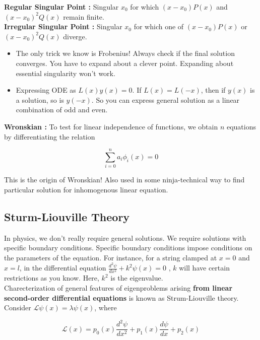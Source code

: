 \documentclass{report}
\begin{document}
\noindent \textbf{Regular Singular Point :} Singular $x_0$ for which $(x-x_0)P(x)$ and $(x-x_0)^2 Q(x)$ remain finite.\\

\noindent \textbf{Irregular Singular Point :} Singular $x_0$ for which one of $(x-x_0)P(x)$ or $(x-x_0)^2 Q(x)$ diverge.\\

\begin{itemize}
  \item The only trick we know is Frobenius! Always check if the final solution converges. You have to expand about a clever point. Expanding about essential singularity won't work.\\

  \item Expressing ODE as $L(x)y(x) = 0$. If $L(x) = L(-x)$, then if $y(x)$ is a solution, so is $y(-x)$. So you can express general solution as a linear combination of odd and even.
\end{itemize}

\noindent \textbf{Wronskian :} To test for linear independence of functions, we obtain $n$ equations by differentiating the relation 

$$\sum_{i=0}^{n}a_i \phi_i (x) = 0$$

\noindent This is the origin of Wronskian! Also used in some ninja-technical way to find particular solution for inhomogenous linear equation.

\subsection{Sturm-Liouville Theory}

In physics, we don't really require general solutions. We require solutions with specific boundary conditions. Specific boundary conditions impose conditions on the parameters of the equation. For instance, for a string clamped at $x=0$ and $x=l$, in the differential equation $\frac{d^2\psi}{dx^2} + k^2\psi(x) = 0$ , $k$ will have certain restrictions as you know. Here, $k^2$ is the eigenvalue.\\

\noindent Charecterization of general features of eigenproblems arising \textbf{from linear second-order differential equations} is known as Strum-Liouville theory.\\

\noindent Consider $\mathcal{L}\psi(x) = \lambda\psi(x)$, where

$$\mathcal{L}(x) = p_0(x)\frac{d^2 \psi}{dx^2} + p_1(x)\frac{d\psi}{dx} + p_2(x)$$
\end{document}
